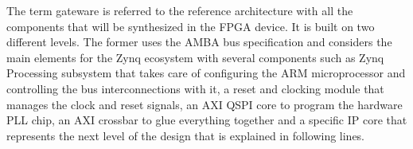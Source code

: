 \documentclass[review]{elsarticle}
\begin{document}
%
%

The term gateware is referred to the reference architecture with all the components that will be synthesized in the FPGA device. It is built on two different levels. The former uses the AMBA bus specification and considers the main elements for the Zynq ecosystem with several components such as Zynq Processing subsystem that takes care of configuring the ARM microprocessor and controlling the bus interconnections with it, a reset and clocking module that manages the clock and reset signals, an AXI QSPI core to program the hardware PLL chip, an AXI crossbar to glue everything together and a specific IP core that represents the next level of the design that is explained in following lines.

\end{document}
